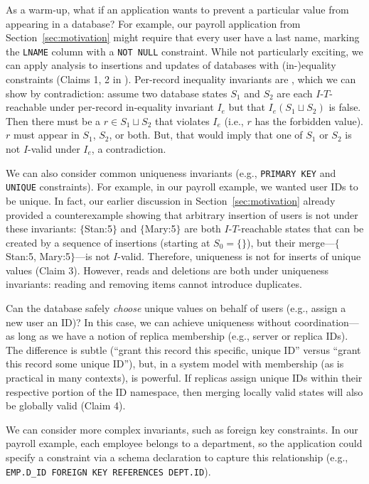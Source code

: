  As a warm-up, what if an application wants to
prevent a particular value from appearing in a database? For example,
our payroll application from Section~\ref{sec:motivation} might
require that every user have a last name, marking the \texttt{LNAME}
column with a \texttt{NOT NULL} constraint. While not particularly
exciting, we can apply \iconfluence analysis to insertions and updates
of databases with (in-)equality constraints (Claims 1, 2 in
\rappendix{\appapply}). Per-record inequality invariants are
\iconfluent, which we can show by contradiction: assume two database
states $S_1$ and $S_2$ are each $I$-$T$-reachable under per-record
in-equality invariant $I_e$ but that $I_e(S_1 \sqcup S_2)$ is
false. Then there must be a $r \in S_1 \sqcup S_2$ that violates $I_e$
(i.e., $r$ has the forbidden value). $r$ must appear in $S_1$, $S_2$,
or both. But, that would imply that one of $S_1$ or $S_2$ is not
$I$-valid under $I_e$, a contradiction.

 We can also consider common uniqueness
invariants (e.g., \texttt{PRIMARY KEY} and \texttt{UNIQUE}
constraints). For example, in our payroll example, we wanted user IDs
to be unique. In fact, our earlier discussion in
Section~\ref{sec:motivation} already provided a counterexample showing
that arbitrary insertion of users is not \iconfluent under these
invariants: $\{$Stan:5$\}$ and $\{$Mary:5$\}$ are both
$I$-$T$-reachable states that can be created by a sequence of
insertions (starting at $S_0=\{\}$), but their merge---$\{$Stan:5,
Mary:5$\}$---is not $I$-valid. Therefore, uniqueness is not
\iconfluent for inserts of unique values (Claim 3). However, reads and
deletions are both \iconfluent under uniqueness invariants: reading
and removing items cannot introduce duplicates.

Can the database safely \textit{choose} unique values on behalf of
users (e.g., assign a new user an ID)? In this case, we can achieve
uniqueness without coordination---as long as we have a notion of
replica membership (e.g., server or replica IDs). The difference is
subtle (``grant this record this specific, unique ID'' versus ``grant
this record some unique ID''), but, in a system model
with membership (as is practical in many contexts), is powerful. If
replicas assign unique IDs within their respective portion of the ID
namespace, then merging locally valid states will also be globally
valid (Claim 4).

 We can consider more complex invariants, such
as foreign key constraints. In our payroll example, each employee
belongs to a department, so the application could specify a constraint
via a schema declaration to capture this relationship (e.g.,
\texttt{EMP.D\_ID FOREIGN KEY REFERENCES DEPT.ID}).

